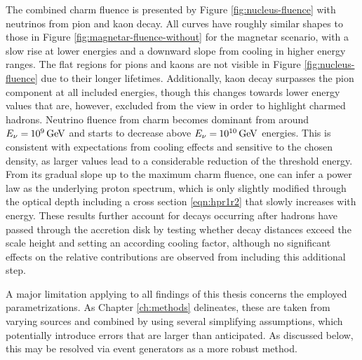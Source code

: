 The combined charm fluence is presented by Figure \ref{fig:nucleus-fluence} with neutrinos from pion and kaon decay. All curves have
roughly similar shapes to those in Figure \ref{fig:magnetar-fluence-without} for the magnetar scenario, with a slow rise at lower
energies and a downward slope from cooling in higher energy ranges. The flat regions for pions and kaons are not visible in Figure
\ref{fig:nucleus-fluence} due to their longer lifetimes. Additionally, kaon decay surpasses the pion component at all included energies,
though this changes towards lower energy values that are, however, excluded from the view in order to highlight charmed hadrons. Neutrino
fluence from charm becomes dominant from around $E_\nu = \kern-0.5pt \qty{e9}{\giga\electronvolt}$ and starts to decrease above
$E_\nu = \kern-0.5pt \qty{e10}{\giga\electronvolt}$ energies. This is consistent with expectations from cooling effects and sensitive
to the chosen density, as larger values lead to a considerable reduction of the threshold energy. From its gradual slope up to the
maximum charm fluence, one can infer a power law as the underlying proton spectrum, which is only slightly modified through the optical
depth including a cross section \eqref{eqn:hpr1r2} that slowly increases with energy. These results further account for decays occurring
after hadrons have passed through the accretion disk by testing whether decay distances exceed the scale height and setting an according
cooling factor, although no significant effects on the relative contributions are observed from including this additional step.

A major limitation applying to all findings of this thesis concerns the employed parametrizations. As Chapter \ref{ch:methods}
delineates, these are taken from varying sources and combined by using several simplifying assumptions, which potentially introduce errors
that are larger than anticipated. As discussed below, this may be resolved via event generators as a more robust method.

\newpage\null\vfill

\vfill\null\newpage\null\vfill

\vfill\null\newpage
